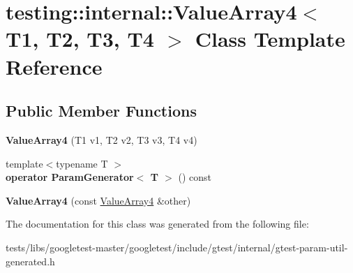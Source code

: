 \hypertarget{classtesting_1_1internal_1_1ValueArray4}{}\section{testing\+:\+:internal\+:\+:Value\+Array4$<$ T1, T2, T3, T4 $>$ Class Template Reference}
\label{classtesting_1_1internal_1_1ValueArray4}
\subsection*{Public Member Functions}
\begin{DoxyCompactItemize}
\item 
\mbox{\label{classtesting_1_1internal_1_1ValueArray4_a5288bbb1a3149842ab13d689cf1fd48f}} 
{\bfseries Value\+Array4} (T1 v1, T2 v2, T3 v3, T4 v4)
\item 
\mbox{\label{classtesting_1_1internal_1_1ValueArray4_aef21f582b20423f5fb8515d9879ad557}} 
{\footnotesize template$<$typename T $>$ }\\{\bfseries operator Param\+Generator$<$ T $>$} () const
\item 
\mbox{\label{classtesting_1_1internal_1_1ValueArray4_a3703e95dc214c47d705cf68fdf2e262b}} 
{\bfseries Value\+Array4} (const \hyperlink{classtesting_1_1internal_1_1ValueArray4}{Value\+Array4} \&other)
\end{DoxyCompactItemize}


The documentation for this class was generated from the following file\+:\begin{DoxyCompactItemize}
\item 
tests/libs/googletest-\/master/googletest/include/gtest/internal/gtest-\/param-\/util-\/generated.\+h\end{DoxyCompactItemize}
